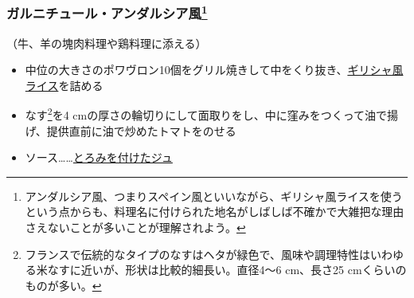 \begin{recette}
\hypertarget{garniture-andalouse}{%
\subsubsection[ガルニチュール・アンダルシア風]{\texorpdfstring{ガルニチュール・アンダルシア風\footnote{アンダルシア風、つまりスペイン風といいながら、ギリシャ風ライスを使うという点からも、料理名に付けられた地名がしばしば不確かで大雑把な理由さえないことが多いことが理解されよう。}}{ガルニチュール・アンダルシア風}}\label{garniture-andalouse}}



（牛、羊の塊肉料理や鶏料理に添える）

\begin{itemize}
\item
  中位の大きさのポワヴロン10個をグリル焼きして中をくり抜き、\protect\hyperlink{riz-grecque}{ギリシャ風ライス}を詰める
\item
  なす\footnote{フランスで伝統的なタイプのなすはヘタが緑色で、風味や調理特性はいわゆる米なすに近いが、形状は比較的細長い。直径4〜6
    cm、長さ25 cmくらいのものが多い。}を4
  cmの厚さの輪切りにして面取りをし、中に窪みをつくって油で揚げ、提供直前に油で炒めたトマトをのせる
\item
  ソース\ldots{}\ldots{}\protect\hyperlink{jus-de-veau-lie}{とろみを付けたジュ}
\end{itemize}

\hypertarget{garniture-arlesienne}{%
}
\end{recette}
